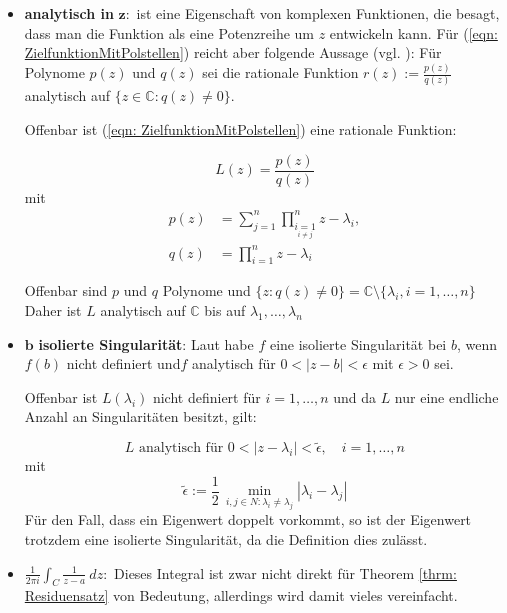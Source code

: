 \documentclass[a4paper,12pt]{report}
\newcommand{\C}{\mathbb C}
\newcommand{\1}{\mathds{1}}
\theoremstyle{plain} %
\theoremstyle{definition} %
\theoremstyle{remark}
\begin{document}
            \begin{itemize}
                  \item \textbf{analytisch in }$\mathbf{z:}$ ist eine Eigenschaft von komplexen Funktionen, die besagt, dass man die Funktion als eine Potenzreihe um $z$ entwickeln kann.
                        Für (\ref{eqn: ZielfunktionMitPolstellen}) reicht aber folgende Aussage (vgl. \cite[S. 24]{complexAnalysis}):
                        Für Polynome $p(z)$ und $q(z)$ sei die rationale Funktion $r(z):=\frac{p(z)}{q(z)}$ analytisch auf $\{z\in\C: q(z)\ne 0\}$.
                        
                        Offenbar ist (\ref{eqn: ZielfunktionMitPolstellen}) eine rationale Funktion:

                        $$L(z) = \frac{p(z)}{q(z)}$$
                        mit 
                        \begin{align*}
                              p(z) &= \sum_{j=1}^{n}\prod_{\underset{i\ne j}{i=1}}^{n} z-\lambda_i,\\
                              q(z) &= \prod_{i=1}^{n} z-\lambda_i
                        \end{align*}

                        Offenbar sind $p$ und $q$ Polynome und $\{z: q(z)\ne 0\} = \C\setminus\{\lambda_i, i=1,\dots,n\}$
                        Daher ist $L$ analytisch auf $\C$ bis auf $\lambda_1,\dots,\lambda_n$
                  \item $\mathbf{b}$\textbf{ isolierte Singularität}:
                        Laut \cite[S. 74]{complexAnalysis} habe $f$ eine isolierte Singularität bei $b$, wenn $f(b)$ nicht definiert und$f$ analytisch für $0<|z-b|<\epsilon$ mit $\epsilon>0$ sei.

                        Offenbar ist $L(\lambda_i)$ nicht definiert für $i=1,\dots,n$ und da $L$ nur eine endliche Anzahl an Singularitäten besitzt, gilt:

                        \begin{equation}
                              \label{hilfe: complexAnalysis_isolierteSingularitäten}
                              L \text{ analytisch für } 0<|z-\lambda_i|<\widetilde{\epsilon},\quad i=1,\dots,n
                        \end{equation}
                        mit
                        $$\widetilde{\epsilon}:= \frac{1}{2}\,\min_{i,j\in N: \lambda_i\ne \lambda_j} |\lambda_i-\lambda_j|$$
                        Für den Fall, dass ein Eigenwert doppelt vorkommt, so ist der Eigenwert trotzdem eine isolierte Singularität, da die Definition dies zulässt.
                  \item $\frac{1}{2\pi i}\int_{C} \frac 1 {z-a}\ dz:$
                        Dieses Integral ist zwar nicht direkt für Theorem \ref{thrm: Residuensatz} von Bedeutung, allerdings wird damit vieles vereinfacht.


\end{itemize}
\end{document}
